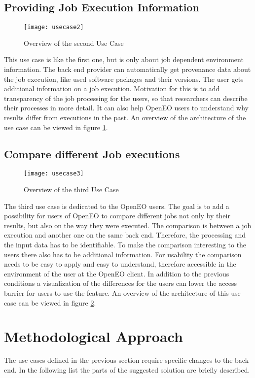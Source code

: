 \documentclass[draft,final]{vutinfth} %
\begin{document}
\subsection{Providing Job Execution Information}\label{UseCase2}
\begin{figure}[h]
	\centering
	\texttt{[image: usecase2]}
	\caption{Overview of the second Use Case}
	\label{fig:usecase2} %
\end{figure}
This use case is like the first one, but is only about job dependent environment information. The back end provider can automatically get provenance data about the job execution, like used software packages and their versions. The user gets additional information on a job execution. Motivation for this is to add transparency of the job processing for the users, so that researchers can describe their processes in more detail. It can also help OpenEO users to understand why results differ from executions in the past. An overview of the architecture of the use case can be viewed in figure \ref{fig:usecase2}. 
\subsection{Compare different Job executions}\label{UseCase3}
\begin{figure}[h]
	\centering
	\texttt{[image: usecase3]}
	\caption{Overview of the third Use Case}
	\label{fig:usecase3} %
\end{figure}
The third use case is dedicated to the OpenEO users. The goal is to add a possibility for users of OpenEO to compare different jobs not only by their results, but also on the way they were executed. The comparison is between a job execution and another one on the same back end. Therefore, the processing and the input data has to be identifiable. To make the comparison interesting to the users there also has to be additional information. For usability the comparison needs to be easy to apply and easy to understand, therefore accessible in the environment of the user at the OpenEO client. In addition to the previous conditions a visualization of the differences for the users can lower the access barrier for users to use the feature. An overview of the architecture of this use case can be viewed in figure \ref{fig:usecase3}.

\section{Methodological Approach}\label{Method}
The use cases defined in the previous section require specific changes to the back end. In the following list the parts of the suggested solution are briefly described. 
\end{document}
